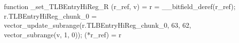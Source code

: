 function _set_TLBEntryHiReg_R (r_ref, v) = {
    r = __bitfield_deref(r_ref);
    r.TLBEntryHiReg_chunk_0 = vector_update_subrange(r.TLBEntryHiReg_chunk_0, 63, 62, vector_subrange(v, 1, 0));
    (*r_ref) = r
}
